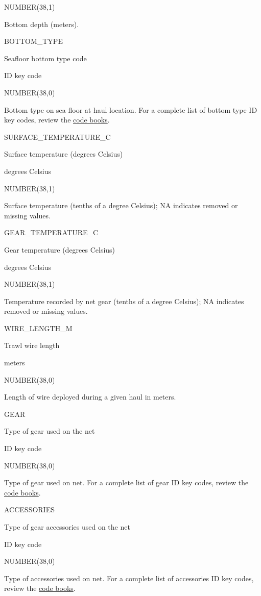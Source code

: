 \documentclass[
  letterpaper,
  oneside,
  open=any]{scrbook}
\begin{document}
NUMBER(38,1)

Bottom depth (meters).

BOTTOM\_TYPE

Seafloor bottom type code

ID key code

NUMBER(38,0)

Bottom type on sea floor at haul location. For a complete list of bottom
type ID key codes, review the
\href{https://www.fisheries.noaa.gov/resource/document/groundfish-survey-species-code-manual-and-data-codes-manual}{code
books}.

SURFACE\_TEMPERATURE\_C

Surface temperature (degrees Celsius)

degrees Celsius

NUMBER(38,1)

Surface temperature (tenths of a degree Celsius); NA indicates removed
or missing values.

GEAR\_TEMPERATURE\_C

Gear temperature (degrees Celsius)

degrees Celsius

NUMBER(38,1)

Temperature recorded by net gear (tenths of a degree Celsius); NA
indicates removed or missing values.

WIRE\_LENGTH\_M

Trawl wire length

meters

NUMBER(38,0)

Length of wire deployed during a given haul in meters.

GEAR

Type of gear used on the net

ID key code

NUMBER(38,0)

Type of gear used on net. For a complete list of gear ID key codes,
review the
\href{https://www.fisheries.noaa.gov/resource/document/groundfish-survey-species-code-manual-and-data-codes-manual}{code
books}.

ACCESSORIES

Type of gear accessories used on the net

ID key code

NUMBER(38,0)

Type of accessories used on net. For a complete list of accessories ID
key codes, review the
\href{https://www.fisheries.noaa.gov/resource/document/groundfish-survey-species-code-manual-and-data-codes-manual}{code
books}.
\end{document}
